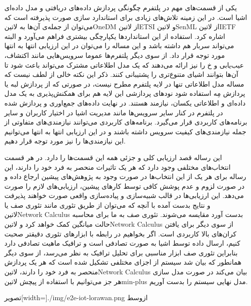 یکی از قسمت‌های مهم
در پلتفرم چگونگی پردازش داده‌های دریافتی و مدل داده‌ای اشیا است. در این زمینه تلاش‌های زیادی برای استاندارد سازی صورت پذیرفته است که می‌توان از
جمله‌ی آن‌ها به ‌لاتین{OneDM} از ‌لاتین{ETSI} و ‌لاتین{SenML} از ‌لاتین{IETF} اشاره کرد. استفاده از این استانداردها یکپارچگی
بیشتری فراهم می‌آورد و البته می‌تواند سربار هم داشته باشد و این مساله را می‌توان در این ارزیابی انتها به انتها مورد توجه قرار داد.
از سوی دیگر پلتفرم‌ها عموما سرویس‌هایی مانند اکتشاف، عیب‌یابی و ‌خ را نیز ارائه می‌دهند که یک مدل اطلاعاتی مشترک می‌تواند باعث شود تا آن‌ها
بتوانند اشیای متنوع‌تری را پشتیبانی کنند.
ذکر این نکته خالی از لطف نیست که مساله مدل اطلاعاتی تنها در لایه پلتفرم مطرح نیست، در صورتی که از پردازش لبه یا پردازش مِه استفاده شود نودهای پردازشی این لایه
هم برای همکنش‌پذیری به یک مدل داده‌ای و اطلاعاتی یکسان، نیازمند هستند.
در نهایت داده‌های جمع‌اوری و پردازش شده در پلتفرم در کنار سایر سرویس‌ها مانند مدیریت اشیا در اختیار کاربران و سایر برنامه‌های کاربردی قرار می‌گیرد.
برنامه‌های کاربردی می‌توانند نیازمندی‌های متفاوتی از جمله نیازمندی‌های کیفیت سرویس داشته باشند و در این ارزیابی انتها به انتها می‌توانیم این نیازمندی‌ها را
نیز مورد توجه قرار دهیم.

این رساله قصد ارزیابی کلی و جزئی همه این قسمت‌ها را دارد. در هر قسمت انتخاب‌های مختلفی وجود دارد که هر یک تاثیرات منحصر به فرد خود را دارند،
این رساله برای هر یک از این انتخاب‌ها در صورت وجود به پژوهش‌های پیشین ارجاع داده و در صورت لزوم و عدم پوشش کافی توسط کارهای پیشین، ارزیابی‌های لازم را صورت می‌دهد.
این ارزیابی‌ها در قالب شبیه‌سازی و پیاده‌سازی واقعی صورت خواهند پذیرفت و نتایج بدست آمده با آنچه که می‌توان از طریق تئوری مانند تئوری صف یا ‌لاتین{Network Calculus}
بدست آورد مقایسه می‌شوند. تئوری صف به ما برای محاسبه حالت میانگین کمک خواهد کرد و ‌لاتین{Network Calculus} از سوی دیگر برای یافتن کران‌های بالا کاربردی است.
اگر بخواهیم در رابطه با ابزارهای تئوری دقیقتر صحبت کنیم، ارسال داده توسط اشیا به صورت تصادفی است و ترافیک ماهیت تصادفی دارد بنابراین تئوری صف ابزار مناسبی برای تحلیل ترافیک به نظر می‌رسد،
از سوی دیگر همانطور که بیان شد سیستم از اجزای مختلفی تشکیل شده است که هر یک پردازش منحصر به فرد خود را دارند، ‌لاتین{Network Calculus} بیان می‌کند در صورت مدل سازی هر جز
می‌توانیم با استفاده از پیچش ‌لاتین{min-plus} مدل نهایی سیستم را بدست آوریم.

‌تصویر[width=\textwidth]{./img/e2e-iot-lorawan.png}
‌ازوسط


